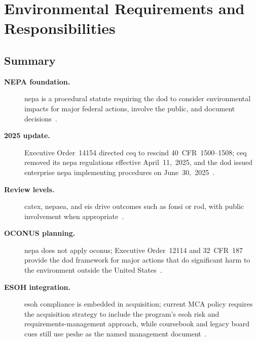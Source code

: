 \documentclass[../main.tex]{subfiles}
\begin{document}
\section{Environmental Requirements and Responsibilities}

\subsection{Summary}
\begin{description}
  \item[\textbf{NEPA foundation.}] \ac{nepa} is a procedural statute requiring the \ac{dod} to consider environmental impacts for major federal actions, involve the public, and document decisions~\autocite{edo-3-3-7-environmental-requirements-2025}.
  \item[\textbf{2025 update.}] Executive Order~14154 directed \ac{ceq} to rescind 40~CFR~1500--1508; \ac{ceq} removed its \ac{nepa} regulations effective April~11,~2025, and the \ac{dod} issued enterprise \ac{nepa} implementing procedures on June~30,~2025~\autocite{CEQ-NEPA-Regulations-Removal-2025,DoD-NEPA-Procedures-2025,edo-3-3-7-environmental-requirements-2025}.
  \item[\textbf{Review levels.}] \ac{catex}, \ac{nepaea}, and \ac{eis} drive outcomes such as \ac{fonsi} or \ac{rod}, with public involvement when appropriate~\autocite{edo-3-3-7-environmental-requirements-2025}.
  \item[\textbf{OCONUS planning.}] \ac{nepa} does not apply \ac{oconus}; Executive Order~12114 and 32~CFR~187 provide the \ac{dod} framework for major actions that do significant harm to the environment outside the United States~\autocite{CFR-32-187,edo-3-3-7-environmental-requirements-2025}.
  \item[\textbf{ESOH integration.}] \ac{esoh} compliance is embedded in acquisition; current MCA policy requires the acquisition strategy to include the program's \ac{esoh} risk and requirements-management approach, while coursebook and legacy board cues still use \ac{peshe} as the named management document~\autocite{DoDI5000-85,edo-3-3-7-environmental-requirements-2025}.
\end{description}
\end{document}
